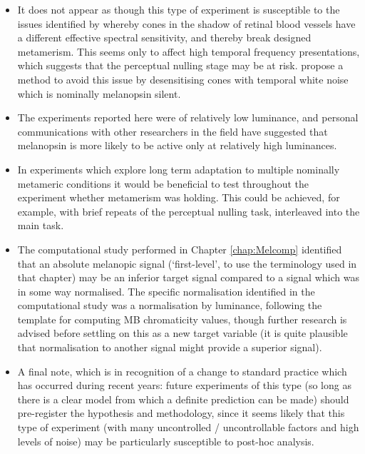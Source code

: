 \begin{itemize}
\item It does not appear as though this type of experiment is susceptible to the issues identified by \citet{spitschan_selective_2015} whereby cones in the shadow of retinal blood vessels have a different effective spectral sensitivity, and thereby break designed metamerism. This seems only to affect high temporal frequency presentations, which suggests that the perceptual nulling stage may be at risk. \citet{zele_melanopsin_2018} propose a method to avoid this issue by desensitising cones with temporal white noise which is nominally melanopsin silent.
\item The experiments reported here were of relatively low luminance, and personal communications with other researchers in the field have suggested that melanopsin is more likely to be active only at relatively high luminances.
\item In experiments which explore long term adaptation to multiple nominally metameric conditions it would be beneficial to test throughout the experiment whether metamerism was holding. This could be achieved, for example, with brief repeats of the perceptual nulling task, interleaved into the main task.
\item The computational study performed in Chapter \ref{chap:Melcomp} identified that an absolute melanopic signal (`first-level', to use the terminology used in that chapter) may be an inferior target signal compared to a signal which was in some way normalised. The specific normalisation identified in the computational study was a normalisation by luminance, following the template for computing \gls{MB} chromaticity values, though further research is advised before settling on this as a new target variable (it is quite plausible that normalisation to another signal might provide a superior signal).
\item A final note, which is in recognition of a change to standard practice which has occurred during recent years: future experiments of this type (so long as there is a clear model from which a definite prediction can be made) should pre-register the hypothesis and methodology, since it seems likely that this type of experiment (with many uncontrolled / uncontrollable factors and high levels of noise) may be particularly susceptible to post-hoc analysis.
\end{itemize}





